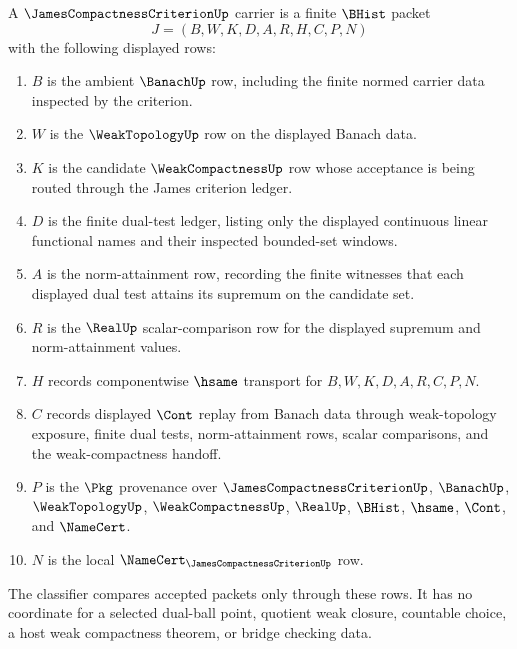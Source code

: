 \begin{definition}
\label{def:james-compactness-criterion-carrier}
A $\JamesCompactnessCriterionUp$ carrier is a finite $\BHist$ packet
$$
J=(B,W,K,D,A,R,H,C,P,N)
$$
with the following displayed rows:
\begin{enumerate}
\item $B$ is the ambient $\BanachUp$ row, including the finite normed carrier data inspected by the criterion.
\item $W$ is the $\WeakTopologyUp$ row on the displayed Banach data.
\item $K$ is the candidate $\WeakCompactnessUp$ row whose acceptance is being routed through the James criterion ledger.
\item $D$ is the finite dual-test ledger, listing only the displayed continuous linear functional names and their inspected bounded-set windows.
\item $A$ is the norm-attainment row, recording the finite witnesses that each displayed dual test attains its supremum on the candidate set.
\item $R$ is the $\RealUp$ scalar-comparison row for the displayed supremum and norm-attainment values.
\item $H$ records componentwise $\hsame$ transport for $B,W,K,D,A,R,C,P,N$.
\item $C$ records displayed $\Cont$ replay from Banach data through weak-topology exposure, finite dual tests, norm-attainment rows, scalar comparisons, and the weak-compactness handoff.
\item $P$ is the $\Pkg$ provenance over $\JamesCompactnessCriterionUp$, $\BanachUp$, $\WeakTopologyUp$, $\WeakCompactnessUp$, $\RealUp$, $\BHist$, $\hsame$, $\Cont$, and $\NameCert$.
\item $N$ is the local $\NameCert_{\JamesCompactnessCriterionUp}$ row.
\end{enumerate}
The classifier compares accepted packets only through these rows. It has no coordinate for a selected dual-ball point, quotient weak closure, countable choice, a host weak compactness theorem, or bridge checking data.
\end{definition}


